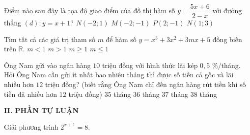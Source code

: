 \begin{ex}%
Điểm nào sau đây là tọa độ giao điểm của đồ thị hàm số $y = \dfrac{5x+6}{2-x}$ với đường thẳng $(d) \colon y = x+1$?
\choice
{$N(-2;1)$}
{\True $M(-2;-1)$}
{$P(2;-1)$}
{$N(1;3)$}
\end{ex}


\begin{ex}%
Tìm tất cả các giá trị tham số $m$ để hàm số $y=x^3+3x^2+3mx+5$   đồng biến trên $\mathbb{R}$.
\choice
{$m<1$}
{$m>1$}
{\True $m \ge 1$}
{$m \le 1$}
\end{ex}


\begin{ex}%
Ông Nam gửi vào ngân  hàng $10$ triệu đồng với hình thức lãi kép  $0{,}5$ $\%$/tháng. Hỏi Ông Nam cần gửi ít nhất 
bao nhiêu tháng thì được số tiền cả gốc và lãi nhiều hơn $12$ triệu đồng? (biết rằng Ông Nam chỉ đến ngân hàng 
rút tiền khi số tiền đã nhiều hơn $12$ triệu đồng)  
\choice
{$35$ tháng}
{$36$ tháng}
{\True $37$ tháng}
{$38$ tháng}
\end{ex}

 \noindent\textbf{II. PHẦN TỰ LUẬN}
\begin{bt}%
Giải phương trình $2^{x+1}=8$.
\end{bt}

